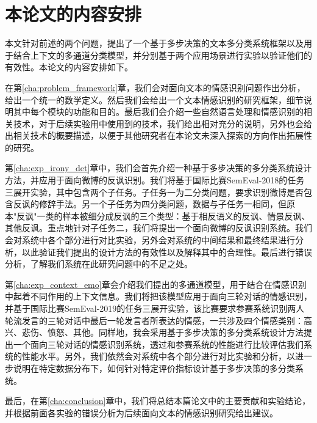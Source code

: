 \section{本论文的内容安排}

本文针对前述的两个问题，提出了一个基于多步决策的文本多分类系统框架以及用于结合上下文的多通道分类模型，并分别基于两个应用场景进行实验以验证他们的有效性。本论文的内容安排如下。

在第\ref{cha:problem_framework}章，我们会对面向文本的情感识别问题作出分析，给出一个统一的数学定义。然后我们会给出一个文本情感识别的研究框架，细节说明其中每个模块的功能和目的。最后我们会介绍一些自然语言处理和情感识别的相关技术，对于后续实验用中使用到的技术，我们给出相对充分的说明，另外也会给出相关技术的概要描述，以便于其他研究者在本论文未深入探索的方向作出拓展性的研究。

第\ref{cha:exp_irony_det}章中，我们会首先介绍一种基于多步决策的多分类系统设计方法，并应用于面向微博的反讽识别。我们将基于国际比赛SemEval-2018的任务三\cite{van2018semeval}展开实验，其中包含两个子任务。子任务一为二分类问题，要求识别微博是否包含反讽的修辞手法。另一个子任务为四分类问题，数据与子任务一相同，但原本"反讽"一类的样本被细分成反讽的三个类型：基于相反语义的反讽、情景反讽、其他反讽。重点地针对子任务二，我们将提出一个面向微博的反讽识别系统。我们会对系统中各个部分进行对比实验，另外会对系统的中间结果和最终结果进行分析，以此验证我们提出的设计方法的有效性以及解释其中的合理性。最后进行错误分析，了解我们系统在此研究问题中的不足之处。

第\ref{cha:exp_context_emo}章会介绍我们提出的多通道模型，用于结合在情感识别中起着不同作用的上下文信息。我们将把该模型应用于面向三轮对话的情感识别，并基于国际比赛SemEval-2019的任务三\cite{SemEval2019Task3}展开实验，该比赛要求参赛系统识别两人轮流发言的三轮对话中最后一轮发言者所表达的情感，一共涉及四个情感类别：高兴、悲伤、愤怒、其他。同样地，我会采用基于多步决策的多分类系统设计方法提出一个面向三轮对话的情感识别系统，透过和参赛系统的性能进行比较评估我们系统的性能水平。另外，我们依然会对系统中各个部分进行对比实验和分析，以进一步说明在特定数据分布下，如何针对特定评价指标设计基于多步决策的多分类系统。

最后，在第\ref{cha:conclusion}章中，我们将总结本篇论文中的主要贡献和实验结论，并根据前面各实验的错误分析为后续面向文本的情感识别研究给出建议。













